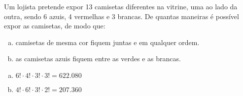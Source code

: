 \begin{ex}
Um lojista pretende expor 13 camisetas diferentes na vitrine, uma ao lado da outra, sendo 6 azuis, 4 vermelhas e 3 brancas. De quantas maneiras é possível expor as camisetas, de modo que:
   \begin{enumerate}[(a)]
   \item camisetas de mesma cor fiquem juntas e em qualquer ordem.
   \item as camisetas azuis fiquem entre as verdes e as brancas.
   \end{enumerate}
     \begin{sol}
       \phantom{A}
        \begin{enumerate} [(a)]
            \item $6!\cdot4!\cdot3!\cdot3!=622.080$
            \item $4!\cdot6!\cdot3!\cdot2!=207.360$
        \end{enumerate}
     \end{sol}
\end{ex}